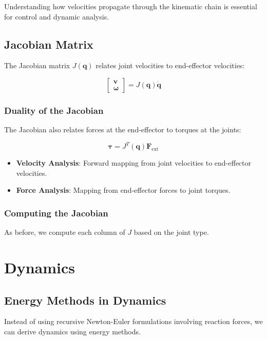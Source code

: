 \documentclass{article}
\begin{document}
Understanding how velocities propagate through the kinematic chain is essential for control and dynamic analysis.

\subsection{Jacobian Matrix}

The Jacobian matrix $J(\mathbf{q})$ relates joint velocities to end-effector velocities:

$$
\begin{bmatrix}
    \mathbf{v} \\ \bm{\omega}
\end{bmatrix} = J(\mathbf{q}) \dot{\mathbf{q}}
$$

\subsubsection{Duality of the Jacobian}

The Jacobian also relates forces at the end-effector to torques at the joints:

$$
\bm{\tau} = J^T(\mathbf{q}) \mathbf{F}_{\text{ext}}
$$

\begin{itemize}
    \item \textbf{Velocity Analysis}: Forward mapping from joint velocities to end-effector velocities.
    \item \textbf{Force Analysis}: Mapping from end-effector forces to joint torques.
\end{itemize}

\subsubsection{Computing the Jacobian}

As before, we compute each column of $J$ based on the joint type.

\section{Dynamics}

\subsection{Energy Methods in Dynamics}

Instead of using recursive Newton-Euler formulations involving reaction forces, we can derive dynamics using energy methods.
\end{document}
